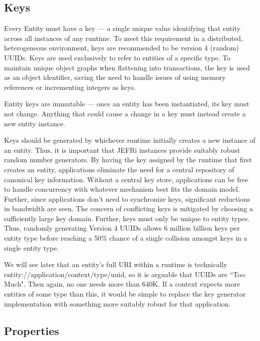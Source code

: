 \documentclass{article}
\begin{document}
\subsection{Keys}

Every Entity must have a key --- a single unique value identifying that entity
across all instances of any runtime. To meet this requirement in a distributed,
heterogeneous environment, keys are recommended to be version 4 (random) UUIDs.
Keys are used exclusively to refer to entities of a specific type. To maintain
unique object graphs when flattening into transactions, the key is used as an
object identifier, saving the need to handle issues of using memory references
or incrementing integers as keys.

Entity keys are immutable --- once an entity has been instantiated, its key must
not change. Anything that could cause a change in a key must instead create a
new entity instance.

Keys should be generated by whichever runtime initially creates a new instance
of an entity. Thus, it is important that JEFRi instances provide suitably robust
random number generators. By having the key assigned by the runtime that first
creates an entity, applications eliminate the need for a central repository of
canonical key information. Without a central key store, applications can be free
to handle concurrency with whatever mechanism best fits the domain model.
Further, since applications don't need to synchronize keys, significant
reductions in bandwidth are seen. The concern of conflicting keys is mitigated
by choosing a sufficiently large key domain. Further, keys must only be unique
to entity types. Thus, randomly generating Version 4 UUIDs allows 6 million
billion keys per entity type before reaching a 50\% chance of a single collision
amongst keys in a single entity type.

We will see later that an entity's full URI within a runtime is technically
{\ilcode entity://\-application/\-context/\-type/\-uuid}, so it is arguable that
UUIDs are ``Too Much". Then again, no one needs more than 640K. If a context
expects more entities of some type than this, it would be simple to replace the
key generator implementation with something more suitably robust for that
application.

\subsection{Properties}
\end{document}
